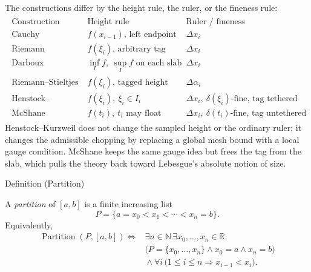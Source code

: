 \begin{remark*}[Interpretation]
The constructions differ by the height rule, the ruler, or the fineness rule:
\[
\begin{aligned}
\begin{array}{c|c|c}
\text{Construction} & \text{Height rule} & \text{Ruler / fineness}\\
\hline
\text{Cauchy} & f(x_{i-1})\text{, left endpoint} & \Delta x_i\\
\text{Riemann} & f(\xi_i)\text{, arbitrary tag} & \Delta x_i\\
\text{Darboux} & \inf_I f,\ \sup_I f\text{ on each slab} & \Delta x_i\\
\text{Riemann--Stieltjes} & f(\xi_i)\text{, tagged height} & \Delta\alpha_i\\
\text{Henstock--Kurzweil} & f(\xi_i),\ \xi_i\in I_i &
\Delta x_i,\ \delta(\xi_i)\text{-fine, tag tethered}\\
\text{McShane} & f(t_i),\ t_i\text{ may float} &
\Delta x_i,\ \delta(t_i)\text{-fine, tag untethered}
\end{array}
\end{aligned}
\]
Henstock--Kurzweil does not change the sampled height or the ordinary ruler;
it changes the admissible chopping by replacing a global mesh bound with a
local gauge condition. McShane keeps the same gauge idea but frees the tag
from the slab, which pulls the theory back toward Lebesgue's absolute notion
of size.
\end{remark*}

\begin{definitionbox}{Definition (Partition)}
\begin{definition}
\label{def:integration-partition}
A \emph{partition} of \([a,b]\) is a finite increasing list
\[
  P=\{a=x_0<x_1<\cdots<x_n=b\}.
\]
Equivalently,
\[
\begin{aligned}
\operatorname{Partition}(P,[a,b])\Longleftrightarrow{}
&\exists n\in\mathbb N\,\exists x_0,\ldots,x_n\in\mathbb R\\
&\bigl(P=\{x_0,\ldots,x_n\}\wedge x_0=a\wedge x_n=b\bigr)\\
&{}\wedge \forall i\,\bigl(1\le i\le n\Rightarrow x_{i-1}<x_i\bigr).
\end{aligned}
\]
\end{definition}
\end{definitionbox}

